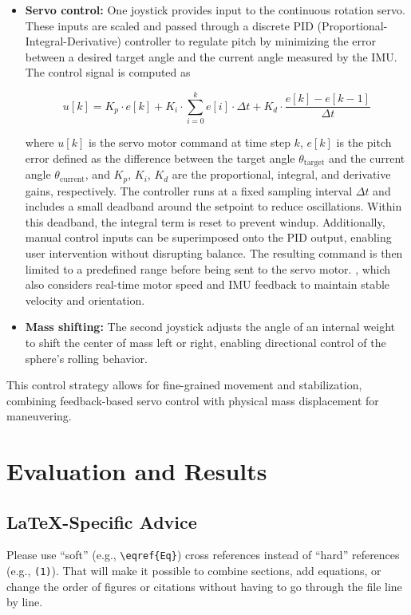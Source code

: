 \documentclass[conference]{IEEEtran}
\begin{document}
\begin{itemize}
    \item \textbf{Servo control:} One joystick provides input to the continuous rotation servo. These inputs are scaled and passed through a discrete PID (Proportional-Integral-Derivative) controller to regulate pitch by minimizing the error between a desired target angle and the current angle measured by the IMU. The control signal is computed as

\[
u[k] = K_p \cdot e[k] + K_i \cdot \sum_{i=0}^{k} e[i] \cdot \Delta t + K_d \cdot \frac{e[k] - e[k-1]}{\Delta t}
\]

where \( u[k] \) is the servo motor command at time step \( k \), \( e[k] \) is the pitch error defined as the difference between the target angle \( \theta_{\text{target}} \) and the current angle \( \theta_{\text{current}} \), and \( K_p \), \( K_i \), \( K_d \) are the proportional, integral, and derivative gains, respectively. The controller runs at a fixed sampling interval \( \Delta t \) and includes a small deadband around the setpoint to reduce oscillations. Within this deadband, the integral term is reset to prevent windup. Additionally, manual control inputs can be superimposed onto the PID output, enabling user intervention without disrupting balance. The resulting command is then limited to a predefined range before being sent to the servo motor.
, which also considers real-time motor speed and IMU feedback to maintain stable velocity and orientation.
    \item \textbf{Mass shifting:} The second joystick adjusts the angle of an internal weight to shift the center of mass left or right, enabling directional control of the sphere's rolling behavior.
\end{itemize}

This control strategy allows for fine-grained movement and stabilization, combining feedback-based servo control with physical mass displacement for maneuvering.


\section{Evaluation and Results}

\subsection{\LaTeX-Specific Advice}

Please use ``soft'' (e.g., \verb|\eqref{Eq}|) cross references instead
of ``hard'' references (e.g., \verb|(1)|). That will make it possible
to combine sections, add equations, or change the order of figures or
citations without having to go through the file line by line.
\end{document}

